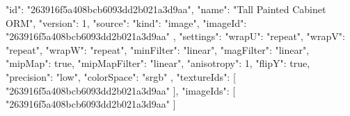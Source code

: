 {
  "id": "263916f5a408bcb6093dd2b021a3d9aa",
  "name": "Tall Painted Cabinet ORM",
  "version": 1,
  "source": {
    "kind": "image",
    "imageId": "263916f5a408bcb6093dd2b021a3d9aa"
  },
  "settings": {
    "wrapU": "repeat",
    "wrapV": "repeat",
    "wrapW": "repeat",
    "minFilter": "linear",
    "magFilter": "linear",
    "mipMap": true,
    "mipMapFilter": "linear",
    "anisotropy": 1,
    "flipY": true,
    "precision": "low",
    "colorSpace": "srgb"
  },
  "textureIds": [
    "263916f5a408bcb6093dd2b021a3d9aa"
  ],
  "imageIds": [
    "263916f5a408bcb6093dd2b021a3d9aa"
  ]
}

